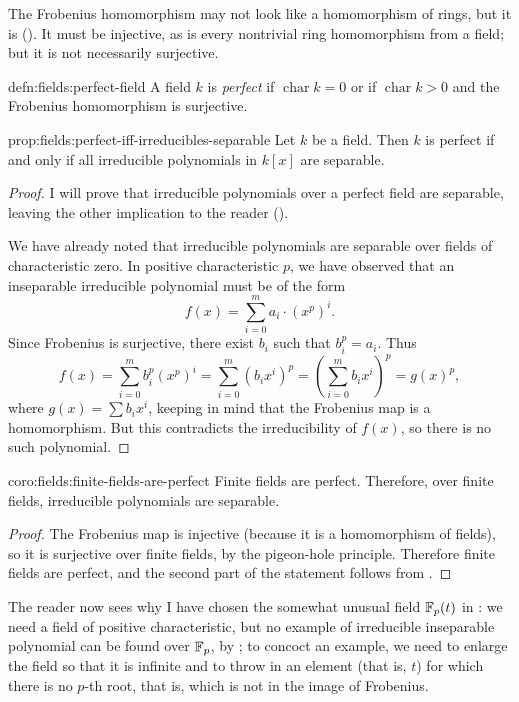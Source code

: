 The Frobenius homomorphism may not look like a homomorphism of rings,
but it is (). It must be
injective, as is every nontrivial ring homomorphism from a field; but
it is not necessarily surjective.
\begin{defn}{}{defn:fields:perfect-field}
  A field $k$ is \emph{perfect} if $\operatorname{char} k = 0$ or if
  $\operatorname{char} k > 0$ and the Frobenius homomorphism is
  surjective.
\end{defn}
\begin{prop}{}{prop:fields:perfect-iff-irreducibles-separable}
  Let $k$ be a field. Then $k$ is perfect if and only if all
  irreducible polynomials in $k[x]$ are separable.
\end{prop}
\begin{proof}
  I will prove that irreducible polynomials over a perfect field are
  separable, leaving the other implication to the reader
  ().

  We have already noted that irreducible polynomials are separable
  over fields of characteristic zero. In positive characteristic $p$,
  we have observed that an inseparable irreducible polynomial must be
  of the form
  \[
    f(x) = \sum_{i=0}^m a_i \cdot {(x^p)}^i.
  \]
  Since Frobenius is surjective, there exist $b_i$ such that
  $b_i^p = a_i$.  Thus
  \[
    f(x) = \sum_{i=0}^m b_i^p {(x^p)}^i = \sum_{i=0}^m {(b_i x^i)}^p =
    {\left(\sum_{i=0}^m b_i x^i\right)}^p = {g(x)}^p,
  \]
  where $g(x) = \sum b_i x^i$, keeping in mind that the Frobenius map
  is a homomorphism. But this contradicts the irreducibility of
  $f(x)$, so there is no such polynomial.
\end{proof}
\begin{coro}{}{coro:fields:finite-fields-are-perfect}
  Finite fields are perfect. Therefore, over finite fields,
  irreducible polynomials are separable.
\end{coro}
\begin{proof}
  The Frobenius map is injective (because it is a homomorphism of
  fields), so it is surjective over finite fields, by the pigeon-hole
  principle.  Therefore finite fields are perfect, and the second part
  of the statement follows from .
\end{proof}
The reader now sees why I have chosen the somewhat unusual field
$\mathbb{F}_p(t)$ in : we need a field of positive
characteristic, but no example of irreducible inseparable polynomial
can be found over $\mathbb{F}_p$, by ; to concoct an
example, we need to enlarge the field so that it is infinite and to
throw in an element (that is, $t$) for which there is no $p$-th root,
that is, which is not in the image of Frobenius.

